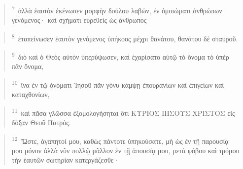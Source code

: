 \documentclass{article}
\newcommand{\currentverse}{1} %
\newcommand{\setcurrentverse}[1]{\renewcommand{\currentverse}{#1}}
\begin{document}
\begin{verse}

\setcurrentverse{7}

\setcounter{footnote}{0}

\textsuperscript{7}~ἀλλὰ ἑαυτὸν ἐκένωσεν μορφὴν δούλου λαβών, ἐν ὁμοιώματι ἀνθρώπων γενόμενος· καὶ σχήματι εὑρεθεὶς ὡς ἄνθρωπος

\end{verse}

\begin{verse}

\setcurrentverse{8}

\setcounter{footnote}{0}

\textsuperscript{8}~ἐταπείνωσεν ἑαυτὸν γενόμενος ὑπήκοος μέχρι θανάτου, θανάτου δὲ σταυροῦ.

\end{verse}

\begin{verse}

\setcurrentverse{9}

\setcounter{footnote}{0}

\textsuperscript{9}~διὸ καὶ ὁ Θεὸς αὐτὸν ὑπερύψωσεν, καὶ ἐχαρίσατο αὐτῷ τὸ ὄνομα τὸ ὑπὲρ πᾶν ὄνομα,

\end{verse}

\begin{verse}

\setcurrentverse{10}

\setcounter{footnote}{0}

\textsuperscript{10}~ἵνα ἐν τῷ ὀνόματι Ἰησοῦ πᾶν γόνυ κάμψῃ ἐπουρανίων καὶ ἐπιγείων καὶ καταχθονίων,

\end{verse}

\begin{verse}

\setcurrentverse{11}

\setcounter{footnote}{0}

\textsuperscript{11}~καὶ πᾶσα γλῶσσα ἐξομολογήσηται ὅτι ΚΥΡΙΟΣ ΙΗΣΟΥΣ ΧΡΙΣΤΟΣ εἰς δόξαν Θεοῦ Πατρός.

\end{verse}

\begin{verse}

\setcurrentverse{12}

\setcounter{footnote}{0}

\textsuperscript{12}~Ὥστε, ἀγαπητοί μου, καθὼς πάντοτε ὑπηκούσατε, μὴ ὡς ἐν τῇ παρουσίᾳ μου μόνον ἀλλὰ νῦν πολλῷ μᾶλλον ἐν τῇ ἀπουσίᾳ μου, μετὰ φόβου καὶ τρόμου τὴν ἑαυτῶν σωτηρίαν κατεργάζεσθε·

\end{verse}
\end{document}
